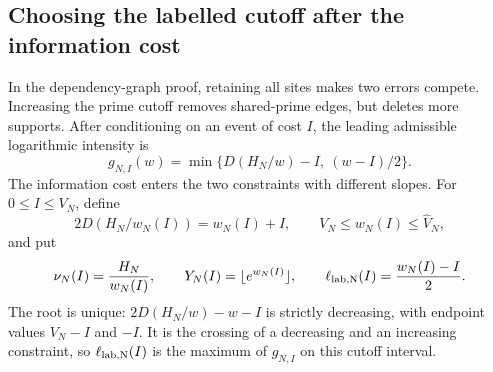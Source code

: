 \subsection{Choosing the labelled cutoff after the information cost}
\label{sec:information-cutoff}
In the dependency-graph proof, retaining all sites makes two errors
compete. Increasing the prime cutoff
removes shared-prime edges, but deletes more supports. After conditioning
on an event of cost $I$, the leading admissible logarithmic intensity is
\[
 g_{N,I}(w)=\min\{D(H_N/w)-I,\ (w-I)/2\}.
\]
The information cost enters the two constraints with different slopes.
For $0\le I\le V_N$, define
\begin{equation}\label{eq:information-saddle}
 2D(H_N/w_N(I))=w_N(I)+I,\qquad V_N\le w_N(I)\le\widehat V_N,
\end{equation}
and put
\begin{equation}\label{eq:information-budget}
 \nu_N(I)=\frac{H_N}{w_N(I)},\qquad
 Y_N(I)=\lfloor e^{w_N(I)}\rfloor,\qquad
 \ell_{\rm lab,N}(I)=\frac{w_N(I)-I}{2}.
\end{equation}
The root is unique: $2D(H_N/w)-w-I$ is strictly decreasing, with
endpoint values $V_N-I$ and $-I$. It is the crossing of a decreasing
and an increasing constraint, so $\ell_{\rm lab,N}(I)$ is the maximum
of $g_{N,I}$ on this cutoff interval.

